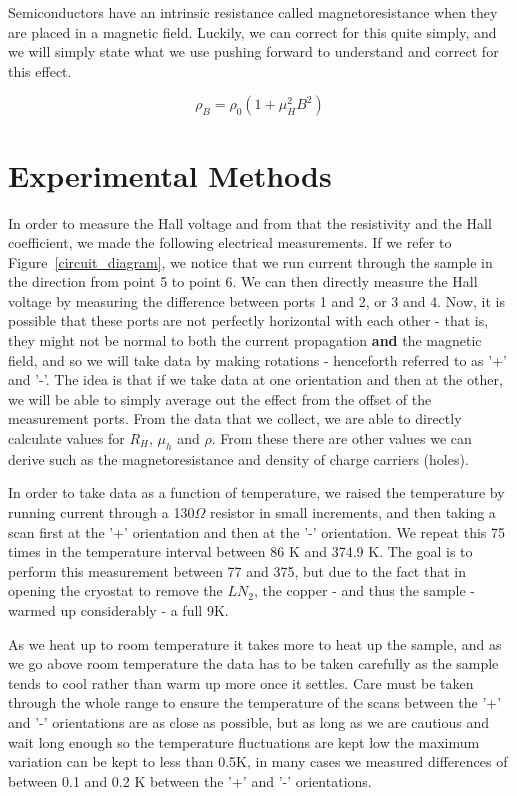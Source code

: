 \documentclass[reprint, nobibnotes, amssymb, amsmath, amsfonts, physics, mathtools, mathrsfs, floatfix]{revtex4-1}
\begin{document}
    Semiconductors have an intrinsic resistance called magnetoresistance when they are placed in a magnetic field.  Luckily, we can correct for this quite simply, and we will simply state what we use pushing forward to understand and correct for this effect.

    \begin{equation}
      \rho_B = \rho_0(1 + \mu_H^2 B^2) \label{magnetoresistance}
    \end{equation}

    \section{Experimental Methods}
    In order to measure the Hall voltage and from that the resistivity and the Hall coefficient, we made the following electrical measurements.  If we refer to Figure~\ref{circuit_diagram}, we notice that we run current through the sample in the direction from point 5 to point 6.  We can then directly measure the Hall voltage by measuring the difference between ports 1 and 2, or 3 and 4.  Now, it is possible that these ports are not perfectly horizontal with each other - that is, they might not be normal to both the current propagation \textbf{and} the magnetic field, and so we will take data by making rotations - henceforth referred to as '+' and '-'.  The idea is that if we take data at one orientation and then at the other, we will be able to simply average out the effect from the offset of the measurement ports.  From the data that we collect, we are able to directly calculate values for $R_H$, $\mu_h$ and $\rho$.  From these there are other values we can derive such as the magnetoresistance and density of charge carriers (holes).

    In order to take data as a function of temperature, we raised the temperature by running current through a 130$\Omega$ resistor in small increments, and then taking a scan first at the '+' orientation and then at the '-' orientation.  We repeat this 75 times in the temperature interval between 86 K and 374.9 K.  The goal is to perform this measurement between 77 and 375, but due to the fact that in opening the cryostat to remove the $LN_2$, the copper - and thus the sample - warmed up considerably - a full 9K.

    As we heat up to room temperature it takes more to heat up the sample, and as we go above room temperature the data has to be taken carefully as the sample tends to cool rather than warm up more once it settles.  Care must be taken through the whole range to ensure the temperature of the scans between the '+' and '-' orientations are as close as possible, but as long as we are cautious and wait long enough so the temperature fluctuations are kept low the maximum variation can be kept to less than 0.5K, in many cases we measured differences of between 0.1 and 0.2 K between the '+' and '-' orientations.
\end{document}
